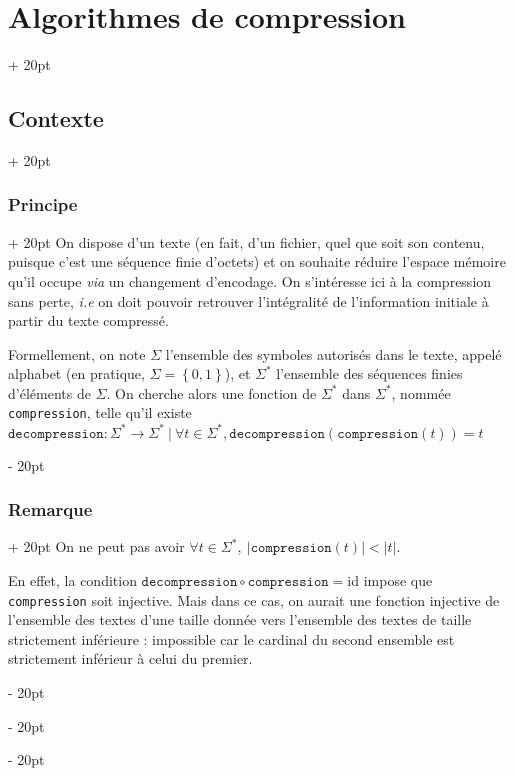 \documentclass[a4paper, 12pt, twoside]{article}
\newcommand{\set}[1]{\left\{ #1 \right\}}
\newcommand{\abs}[1]{\left\lvert #1 \right\rvert}
\newcommand{\ind}[1][20pt]{\advance\leftskip + #1}
\newcommand{\deind}[1][20pt]{\advance\leftskip - #1}
\newenvironment{indt}[2][20pt]{#2 \par \ind[#1]}{\par \deind} %
\begin{document}
    \begin{indt}{\section{Algorithmes de compression}}
        \begin{indt}{\subsection{Contexte}}
            \begin{indt}{\subsubsection{Principe}}
                On dispose d'un texte (en fait, d'un fichier, quel que soit son contenu, puisque c'est une séquence finie d'octets) et on souhaite réduire l'espace mémoire qu'il occupe \textit{via} un changement d'encodage.
                On s'intéresse ici à la compression sans perte, \textit{i.e} on doit pouvoir retrouver l'intégralité de l'information initiale à partir du texte compressé.

                Formellement, on note $\Sigma$ l'ensemble des symboles autorisés dans le texte, appelé alphabet (en pratique, $\Sigma = \set{0, 1}$), et $\Sigma^*$ l'ensemble des séquences finies d'éléments de $\Sigma$.
                On cherche alors une fonction de $\Sigma^*$ dans $\Sigma^*$, nommée \texttt{compression}, telle qu'il existe $\mathtt{decompression} : \Sigma^* \longrightarrow \Sigma^* \ |\ \forall t \in \Sigma^*, \mathtt{decompression}(\mathtt{compression}(t)) = t$
            \end{indt}

            \vspace{12pt}
            
            \begin{indt}{\subsubsection{Remarque}}
                On ne peut pas avoir $\forall t \in \Sigma^*,\ \abs{\mathtt{compression}(t)} < \abs t$.

                En effet, la condition $\mathtt{decompression} \circ \mathtt{compression} = \mathrm{id}$ impose que \texttt{compression} soit injective.
                Mais dans ce cas, on aurait une fonction injective de l'ensemble des textes d'une taille donnée vers l'ensemble des textes de taille strictement inférieure : impossible car le cardinal du second ensemble est strictement inférieur à celui du premier.


\end{indt}
\end{indt}
\end{indt}
\end{document}
